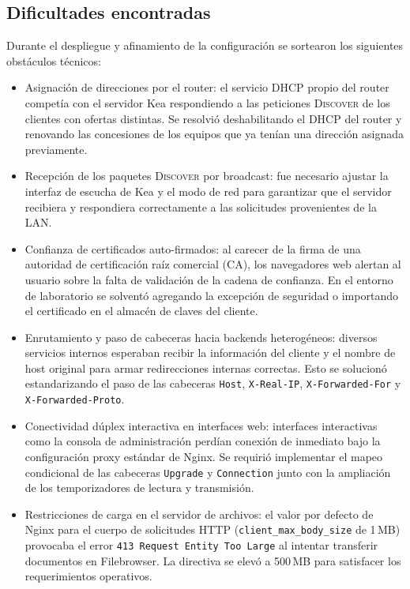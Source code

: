 \subsection{Dificultades encontradas}

Durante el despliegue y afinamiento de la configuración se sortearon los
siguientes obstáculos técnicos:

\begin{itemize}
  \item Asignación de direcciones por el router: el servicio DHCP propio del
        router competía con el servidor Kea respondiendo a las peticiones
        \textsc{Discover} de los clientes con ofertas distintas. Se resolvió
        deshabilitando el DHCP del router y renovando las concesiones de los
        equipos que ya tenían una dirección asignada previamente.
  \item Recepción de los paquetes \textsc{Discover} por broadcast: fue
        necesario ajustar la interfaz de escucha de Kea y el modo de red para
        garantizar que el servidor recibiera y respondiera correctamente a las
        solicitudes provenientes de la LAN.
  \item Confianza de certificados auto-firmados: al carecer de la firma de una
        autoridad de certificación raíz comercial (CA), los navegadores web
        alertan al usuario sobre la falta de validación de la cadena de
        confianza. En el entorno de laboratorio se solventó agregando la
        excepción de seguridad o importando el certificado en el almacén de
        claves del cliente.
  \item Enrutamiento y paso de cabeceras hacia backends heterogéneos: diversos
        servicios internos esperaban recibir la información del cliente y el
        nombre de host original para armar redirecciones internas correctas.
        Esto se solucionó estandarizando el paso de las cabeceras \texttt{Host},
        \texttt{X-Real-IP}, \texttt{X-Forwarded-For} y
        \texttt{X-Forwarded-Proto}.
  \item Conectividad dúplex interactiva en interfaces web: interfaces interactivas
        como la consola de administración perdían conexión de inmediato bajo la
        configuración proxy estándar de Nginx. Se requirió implementar el mapeo
        condicional de las cabeceras \texttt{Upgrade} y \texttt{Connection}
        junto con la ampliación de los temporizadores de lectura y transmisión.
  \item Restricciones de carga en el servidor de archivos: el valor por defecto
        de Nginx para el cuerpo de solicitudes HTTP (\texttt{client\_max\_body\_size}
        de 1\,MB) provocaba el error \texttt{413 Request Entity Too Large} al
        intentar transferir documentos en Filebrowser. La directiva se elevó a
        500\,MB para satisfacer los requerimientos operativos.
\end{itemize}

